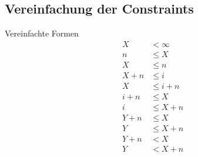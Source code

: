 \documentclass[hyperref={pdfpagelabels=false}]{beamer}
\begin{document}
\subsection{Vereinfachung der Constraints}
\label{simp}
\begin{frame}
	\begin{block}{Vereinfachte Formen}
		\begin{align}
			\label{case00} X &< \infty \\
			\label{case03} n &\leq X \\
			\label{case04} X &\leq n \\
			\label{case01} X + n &\leq i \\
			\label{case02} X &\leq i + n \\
			\label{case05} i + n &\leq X \\
			\label{case06} i &\leq X + n \\
			\label{case07} Y + n &\leq X \\
			\label{case08} Y &\leq X + n \\
			\label{case09} Y + n &< X \\
			\label{case10} Y &< X + n
		\end{align}
	\end{block}
\end{frame}
\end{document}
